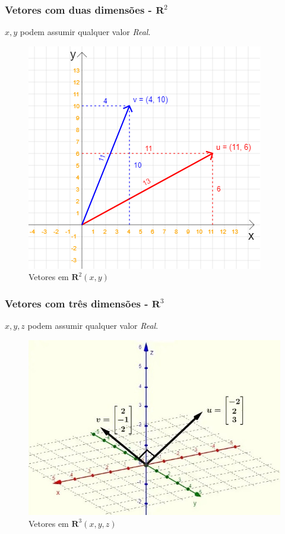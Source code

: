 \documentclass[12pt]{article}
\begin{document}
\subsubsection{Vetores com duas dimensões - \( \mathbf{R}^{2} \)}

\(x, y\) podem assumir qualquer valor \textit{Real}.

\begin{figure}[H]
	\centering
	\includegraphics[height=.45\textheight]{figuras/vetores_02}
	\caption[Vetores em \( \mathbf{R}^{2} \)]{Vetores em \( \mathbf{R}^{2} (x, y)\)}
	\label{fig:vetores02}
\end{figure}

\newpage

\subsubsection{Vetores com três dimensões - \( \mathbf{R}^{3} \)}

\(x, y, z\) podem assumir qualquer valor \textit{Real}.

\begin{figure}[H]
	\centering
	\includegraphics[width=0.5\linewidth]{"figuras/vetores R3"}
	\caption[Vetores em \( \mathbf{R}^{3} \)]{Vetores em \( \mathbf{R}^{3} (x, y, z)\)}
	\label{fig:vetores-r3}
\end{figure}
\end{document}
